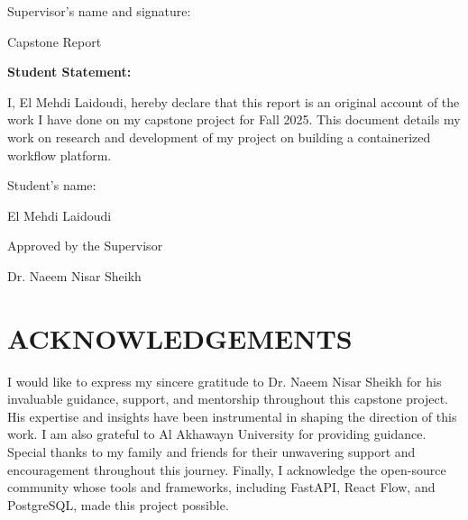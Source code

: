 \documentclass[12pt]{article}
\begin{document}
\vspace{2cm}

Supervisor's name and signature: \hspace{4cm} \underline{\hspace{5cm}}


\newpage

\begin{center}
Capstone Report
\end{center}

\vspace{0.5cm}

\noindent
\textbf{Student Statement:}

I, El Mehdi Laidoudi, hereby declare that this report is an original account of the work I have done on my capstone project for Fall 2025. This document details my work on research and development of my project on building a containerized workflow platform.

\vspace{2cm}

\noindent
\makebox[\textwidth]{\hrulefill}

\begin{center}
Student's name:

El Mehdi Laidoudi
\end{center}

\vspace{3cm}

\begin{center}
Approved by the Supervisor
\end{center}

\vspace{2cm}

\noindent
\makebox[\textwidth]{\hrulefill}

\begin{center}
Dr. Naeem Nisar Sheikh
\end{center}

\newpage
\section*{ACKNOWLEDGEMENTS}

\noindent
\parbox{\textwidth}{%
I would like to express my sincere gratitude to Dr. Naeem Nisar Sheikh for his invaluable guidance, support, and mentorship throughout this capstone project. His expertise and insights have been instrumental in shaping the direction of this work. I am also grateful to Al Akhawayn University for providing guidance. Special thanks to my family and friends for their unwavering support and encouragement throughout this journey. Finally, I acknowledge the open-source community whose tools and frameworks, including FastAPI, React Flow, and PostgreSQL, made this project possible.
}
\end{document}
